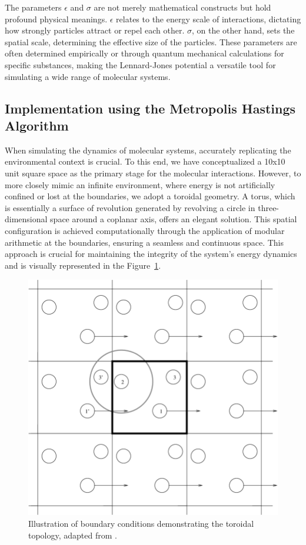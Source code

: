 \documentclass{report}
\begin{document}
The parameters \( \epsilon \) and \( \sigma \) are not merely mathematical constructs but hold profound physical meanings. \( \epsilon \) relates to the energy scale of interactions, dictating how strongly particles attract or repel each other. \( \sigma \), on the other hand, sets the spatial scale, determining the effective size of the particles. These parameters are often determined empirically or through quantum mechanical calculations for specific substances, making the Lennard-Jones potential a versatile tool for simulating a wide range of molecular systems.

\subsection{Implementation using the Metropolis Hastings Algorithm}
\label{sec:metropolis_hastings_implementation}

When simulating the dynamics of molecular systems, accurately replicating the environmental context is crucial. To this end, we have conceptualized a 10x10 unit square space as the primary stage for the molecular interactions. However, to more closely mimic an infinite environment, where energy is not artificially confined or lost at the boundaries, we adopt a toroidal geometry. A torus, which is essentially a surface of revolution generated by revolving a circle in three-dimensional space around a coplanar axis, offers an elegant solution. This spatial configuration is achieved computationally through the application of modular arithmetic at the boundaries, ensuring a seamless and continuous space. This approach is crucial for maintaining the integrity of the system's energy dynamics and is visually represented in the Figure~\ref{fig:boundaryconditions}.

\begin{figure}[H]
	\centering
	\includegraphics[width=0.5\linewidth]{./Figures/MCMC/LennardJones/boundaryconditions.png}
	\caption{Illustration of boundary conditions demonstrating the toroidal topology, adapted from \cite{hunt2003arnold}.}
	\label{fig:boundaryconditions}
\end{figure}
\end{document}
